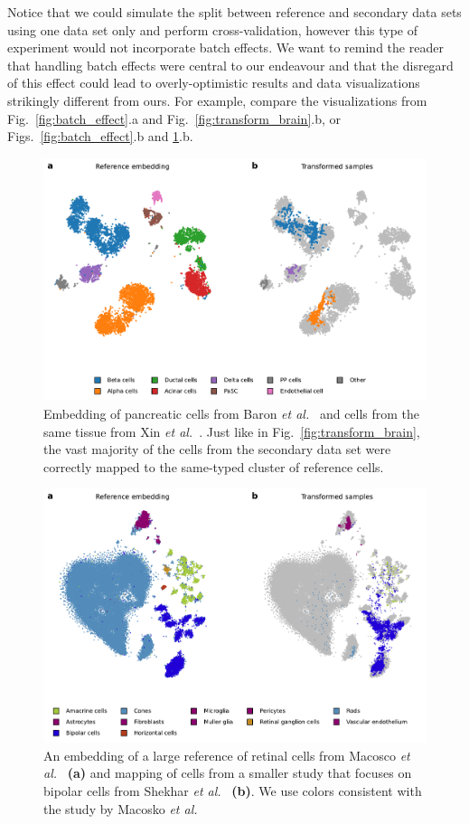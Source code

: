 \documentclass[runningheads]{llncs}
\newcommand{\etal}{\textit{et al.}}
\begin{document}
Notice that we could simulate the split between reference and secondary data
sets using one data set only and perform cross-validation, however this type of
experiment would not incorporate batch effects. We want to remind the reader
that handling batch effects were central to our endeavour and that the
disregard of this effect could lead to overly-optimistic results and data
visualizations strikingly different from ours. For example, compare the
visualizations from Fig.~\ref{fig:batch_effect}.a and
Fig.~\ref{fig:transform_brain}.b, or Figs.~\ref{fig:batch_effect}.b and
\ref{fig:transform_pancreas}.b.


\begin{figure}[htb]
  \includegraphics[width=\textwidth]{transform_pancreas.pdf}
  \caption{Embedding of pancreatic cells from Baron \etal~\cite{Baron2016} and
  cells from the same tissue from Xin \etal~\cite{Xin2016}. Just like in
  Fig.~\ref{fig:transform_brain}, the vast majority of the cells from the
  secondary data set were correctly mapped to the same-typed cluster of
  reference cells.}
  \label{fig:transform_pancreas}
\end{figure}


\begin{figure}[htb]
  \includegraphics[width=\textwidth]{transform_retina.pdf}
  \caption{An embedding of a large reference of retinal cells from Macosco
  \etal~\cite{Macosko2015} \textbf{(a)} and mapping of cells from a smaller study that
  focuses on bipolar cells from Shekhar \etal~\cite{Shekhar2016} \textbf{(b)}. We use
  colors consistent with the study by Macosko \etal}
  \label{fig:transform_retina}
\end{figure}
\end{document}
